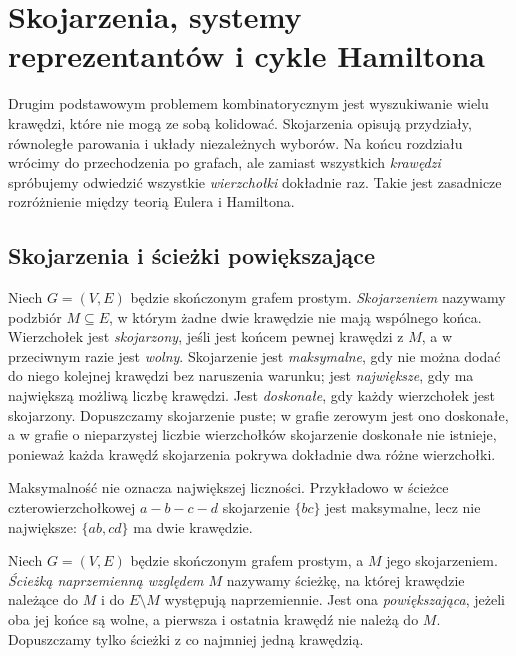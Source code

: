 \chapter{Skojarzenia, systemy reprezentantów i cykle Hamiltona}
\label{ch:tg-skojarzenia}

Drugim podstawowym problemem kombinatorycznym jest wyszukiwanie
wielu krawędzi, które nie mogą ze sobą kolidować. Skojarzenia
opisują przydziały, równoległe parowania i układy niezależnych
wyborów. Na końcu rozdziału wrócimy do przechodzenia po grafach,
ale zamiast wszystkich \emph{krawędzi} spróbujemy odwiedzić
wszystkie \emph{wierzchołki} dokładnie raz. Takie jest
zasadnicze rozróżnienie między teorią Eulera i Hamiltona.

\section{Skojarzenia i ścieżki powiększające}
\label{sec:tg-matchings}

\begin{definicja}[Skojarzenie]
Niech $G=(V,E)$ będzie skończonym grafem prostym.
\emph{Skojarzeniem} nazywamy podzbiór $M\subseteq E$,
w którym żadne dwie krawędzie nie mają wspólnego końca.
Wierzchołek jest \emph{skojarzony}, jeśli jest końcem
pewnej krawędzi z $M$, a w przeciwnym razie jest
\emph{wolny}. Skojarzenie jest \emph{maksymalne}, gdy
nie można dodać do niego kolejnej krawędzi bez
naruszenia warunku; jest \emph{największe}, gdy ma
największą możliwą liczbę krawędzi. Jest \emph{doskonałe},
gdy każdy wierzchołek jest skojarzony. Dopuszczamy
skojarzenie puste; w grafie zerowym jest ono doskonałe,
a w grafie o nieparzystej liczbie wierzchołków
skojarzenie doskonałe nie istnieje, ponieważ każda
krawędź skojarzenia pokrywa dokładnie dwa różne wierzchołki.
\end{definicja}

Maksymalność nie oznacza największej liczności.
Przykładowo w ścieżce czterowierzchołkowej $a-b-c-d$
skojarzenie $\{bc\}$ jest maksymalne, lecz nie największe:
$\{ab,cd\}$ ma dwie krawędzie.

\begin{definicja}
Niech $G=(V,E)$ będzie skończonym grafem prostym,
a $M$ jego skojarzeniem. \emph{Ścieżką
naprzemienną względem $M$} nazywamy ścieżkę, na której
krawędzie należące do $M$ i do $E\setminus M$
występują naprzemiennie. Jest ona \emph{powiększająca},
jeżeli oba jej końce są wolne, a pierwsza i ostatnia
krawędź nie należą do $M$. Dopuszczamy tylko ścieżki
z co najmniej jedną krawędzią.
\end{definicja}

